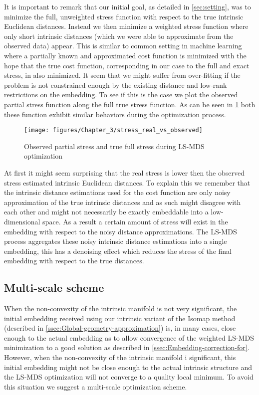 	It is important to remark that our initial goal, as detailed in \cref{sec:setting}, was to minimize the full, unweighted stress function with respect to the true intrinsic Euclidean distances. Instead we then minimize a weighted stress function where only short intrinsic distances (which we were able to approximate from the observed data) appear. This is similar to common setting in machine learning where a partially known and approximated cost function is minimized with the hope that the true cost function, corresponding in our case to the full and exact stress, in also minimized. It seem that we might suffer from over-fitting if the problem is not constrained enough by the existing distance and low-rank restrictions on the embedding. To see if this is the case we plot the observed partial stress function along the full true stress function. As can be seen in \cref{fig:Stress-Plot-Full} both these function exhibit similar behaviors during the optimization process.
	\begin{figure}[h]
		\begin{centering}
			\texttt{[image: figures/Chapter\_3/stress\_real\_vs\_observed]}
			\par\end{centering}
		\caption{Observed partial stress and true full stress during \ac{LS-MDS} optimization\label{fig:Stress-Plot-Full}}
	\end{figure}
	At first it might seem surprising that the real stress is lower then the observed stress estimated intrinsic Euclidean distances. To explain this we remember that the intrinsic distance estimations used for the cost function are only noisy approximation of the true intrinsic distances and as such might disagree with each other and might not necessarily be exactly embeddable into a low-dimensional space. As a result a certain amount of stress will exist in the embedding with respect to the noisy distance approximations. The \ac{LS-MDS} process aggregates these noisy intrinsic distance estimations into a single embedding, this has a denoising effect which reduces the stress of the final embedding with respect to the true distances.
	
	\subsection{Multi-scale scheme}
	
	When the non-convexity of the intrinsic manifold is not very significant, the initial embedding received using our intrinsic variant of the Isomap method (described in \cref{ssec:Global-geometry-approximation}) is, in many cases, close enough to the actual embedding as to allow convergence of the weighted \ac{LS-MDS} minimization to a good solution as described in \cref{ssec:Embedding-correction-for}. However, when the non-convexity of the intrinsic manifold i significant, this initial embedding might not be close enough to the actual intrinsic structure and the \ac{LS-MDS} optimization will not converge to a quality local minimum. To avoid this situation we suggest a multi-scale optimization scheme.
	
